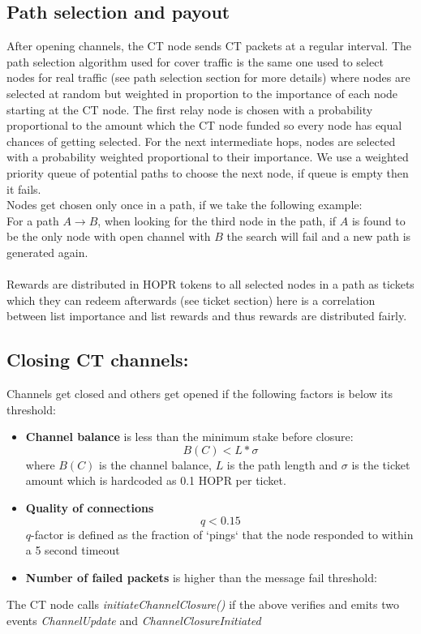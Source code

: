 \subsection{Path selection and payout}
After opening channels, the CT node sends CT packets at a regular interval. The path selection algorithm used for cover traffic is the same one used to select nodes for real traffic (see path selection section for more details) where nodes are selected at random  but weighted in proportion to the importance of each node starting at the CT node.
The first relay node is chosen with a probability proportional to the amount which the CT node funded so every node has equal chances of getting selected. For the next intermediate hops, nodes are selected with a probability weighted proportional to their importance. We use a weighted priority queue of potential paths to choose the next node, if queue is empty then it fails.
\\Nodes get chosen only once in a path, if we take the following example:
\\For a path $A\rightarrow B$, when looking for the third node in the path, if $A$ is found to be the only node with open channel with $B$ the search will fail and a new path is generated again.
\\~\\ Rewards are distributed in HOPR tokens to all selected nodes in a path as tickets which they can redeem afterwards (see ticket section) here is a correlation between list importance and list 
rewards and thus rewards are distributed fairly.


\subsection{Closing CT channels:}
Channels get closed and others get opened if the following factors is below its threshold:
  \begin{itemize}
      \item \textbf{Channel balance} is less than the minimum stake before closure:
      $$B(C) < L * \sigma$$
      where $B(C)$ is the channel balance, $L$ is the path length and $\sigma$ is the ticket amount which is hardcoded as 0.1 HOPR per ticket.
      \item \textbf{Quality of connections}
      $$q < 0.15$$ $q$-factor is defined as the fraction of `pings` that the node responded to within a 5 second timeout
      \item \textbf{Number of failed packets} is higher than the message fail threshold:
      $$ $$
  \end{itemize}
The CT node calls \textit{initiateChannelClosure()} if the above verifies and emits two events \textit{ChannelUpdate} and \textit{ChannelClosureInitiated}
